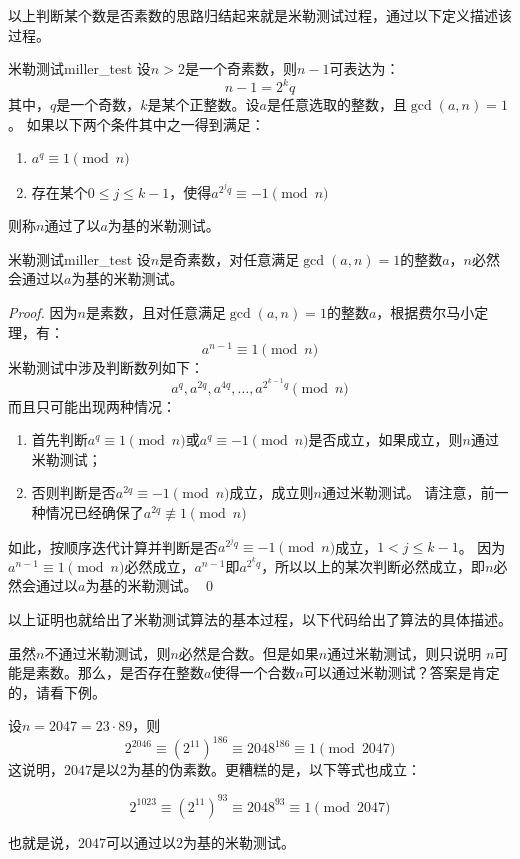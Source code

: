 以上判断某个数是否素数的思路归结起来就是米勒测试过程，通过以下定义描述该过程。
\begin{definition}{米勒测试}{miller_test}
设$n > 2$是一个奇素数，则$n-1$可表达为：
\[ n - 1 = 2^{k} q\]
其中，$q$是一个奇数，$k$是某个正整数。设$a$是任意选取的整数，且$\gcd(a, n)=1$。
如果以下两个条件其中之一得到满足：
\begin{enumerate}
	\item $a^q \equiv 1 \pmod{n}$
	
	\item 存在某个$0 \leq j \leq k -1 $，使得$a^{2^{j}q} \equiv -1 \pmod{n}$
	\end{enumerate}
则称$n$通过了以$a$为基的米勒测试。
\end{definition}

\begin{theorem}{米勒测试}{miller_test}
 设$n$是奇素数，对任意满足$\gcd(a, n)=1$的整数$a$，$n$必然会通过以$a$为基的米勒测试。
\end{theorem}

\begin{proof}
因为$n$是素数，且对任意满足$\gcd(a, n)=1$的整数$a$，根据费尔马小定理，有：
\[a^{n-1} \equiv 1 \pmod{n}\]
米勒测试中涉及判断数列如下：
\[a^q, a^{2q}, a^{4q}, \ldots, a^{2^{k-1}q} \pmod{n}\]
而且只可能出现两种情况：
\begin{enumerate}
\item 首先判断$a^q \equiv 1 \pmod{n}$或$a^q \equiv -1 \pmod{n}$是否成立，如果成立，则$n$通过米勒测试；

\item 否则判断是否$a^{2q} \equiv -1\pmod{n}$成立，成立则$n$通过米勒测试。
请注意，前一种情况已经确保了$a^{2q} \not\equiv 1\pmod{n}$
\end{enumerate} 
如此，按顺序迭代计算并判断是否$a^{2^{j}q} \equiv -1\pmod{n}$成立，$1 < j \leq k-1$。
因为$a^{n-1} \equiv 1 \pmod{n}$必然成立，$a^{n-1}$即$a^{2^{k}q}$，所以以上的某次判断必然成立，即$n$必然会通过以$a$为基的米勒测试。
	\qed
\end{proof}

以上证明也就给出了米勒测试算法的基本过程，以下代码给出了算法的具体描述。

\begin{center}
\label{alg:miller_test}
	
\end{center}

虽然$n$不通过米勒测试，则$n$必然是合数。但是如果$n$通过米勒测试，则只说明
$n$可能是素数。那么，是否存在整数$a$使得一个合数$n$可以通过米勒测试？答案是肯定的，请看下例。
\begin{example}
设$n = 2047 = 23 \cdot 89$，则
\[2^{2046} \equiv (2^{11})^{186} \equiv 2048^{186} \equiv 1 \pmod{2047} \]
这说明，$2047$是以$2$为基的伪素数。更糟糕的是，以下等式也成立：

\[2^{1023} \equiv (2^{11})^{93} \equiv 2048^{93} \equiv 1 \pmod{2047} \]

也就是说，$2047$可以通过以$2$为基的米勒测试。
\end{example}

